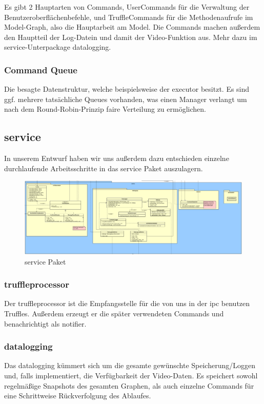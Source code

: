 Es gibt 2 Hauptarten von Commands, UserCommands für die Verwaltung der
Benutzeroberflächenbefehle, und TruffleCommands für die Methodenaufrufe im
Model-Graph, also die Hauptarbeit am Model. Die Commands machen außerdem den
Hauptteil der Log-Datein und damit der Video-Funktion aus. Mehr dazu im
service-Unterpackage datalogging.

\subsubsection{Command Queue}
Die besagte Datenstruktur, welche beispielsweise der executor besitzt. Es
sind ggf. mehrere tatsächliche Queues vorhanden, was einen Manager verlangt
um nach dem Round-Robin-Prinzip faire Verteilung zu ermöglichen.


\subsection{service}


In unserem Entwurf haben wir uns außerdem dazu entschieden einzelne
durchlaufende Arbeitsschritte in das service Paket auszulagern.\newline

\begin{figure}[H]
  \centering
  \includegraphics[width=\textwidth]{../diagramimages/service.png}
  \caption{service Paket}
  \medskip
\end{figure}

    \subsubsection{truffleprocessor}
    Der truffleprocessor ist die Empfangsstelle für die von uns in der
    \gls{ipc} benutzen Truffles. Außerdem erzeugt er die später verwendeten
    Commands und benachrichtigt als \gls{notifier}.

    \subsubsection{datalogging}
    Das datalogging kümmert sich um die gesamte gewünschte
    Speicherung/Loggen und, falls implementiert, die Verfügbarkeit der
    Video-Daten. Es speichert sowohl regelmäßige Snapshots des gesamten
    Graphen, als auch einzelne Commands für eine Schrittweise Rückverfolgung
    des Ablaufes.

